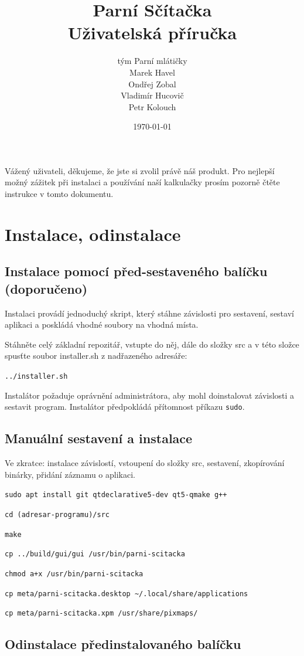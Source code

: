 \documentclass[a4paper]{article}
\title{\Huge Parní Sčítačka\\\huge Uživatelská příručka}
\author{\LARGE tým Parní mlátičky \\ Marek Havel \\ Ondřej Zobal\\ Vladimír Hucovič\\ Petr Kolouch}
\date{\today}
\begin{document}
\maketitle

Vážený uživateli, děkujeme, že jste si zvolil právě náš produkt. Pro nejlepší možný zážitek při instalaci a používání naší kalkulačky prosím pozorně čtěte instrukce v tomto dokumentu.

\section*{Instalace, odinstalace}

\subsection*{Instalace pomocí před-sestaveného balíčku (doporučeno)}

Instalaci provádí jednoduchý skript, který stáhne závislosti pro sestavení, sestaví aplikaci a poskládá vhodné soubory na vhodná místa.

Stáhněte celý základní repozitář, vstupte do něj, dále do složky src a v této složce spusťte soubor installer.sh z nadřazeného adresáře:

\verb|../installer.sh|

Instalátor požaduje oprávnění administrátora, aby mohl doinstalovat závislosti a sestavit program. Instalátor předpokládá přítomnost příkazu \verb|sudo|.

\subsection*{Manuální sestavení a instalace}

Ve zkratce: instalace závislostí, vstoupení do složky src, sestavení, zkopírování binárky, přidání záznamu o aplikaci.

\verb|sudo apt install git qtdeclarative5-dev qt5-qmake g++|

\verb|cd (adresar-programu)/src|

\verb|make|

\verb|cp ../build/gui/gui /usr/bin/parni-scitacka|

\verb|chmod a+x /usr/bin/parni-scitacka|

\verb|cp meta/parni-scitacka.desktop ~/.local/share/applications|

\verb|cp meta/parni-scitacka.xpm /usr/share/pixmaps/|

\subsection*{Odinstalace předinstalovaného balíčku}
\end{document}
